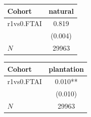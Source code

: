 {
\def\sym#1{\ifmmode^{#1}\else\(^{#1}\)\fi}
\begin{tabular}{l*{1}{c}}
\toprule
Cohort    &  natural   \\
\midrule
r1vs0.FTAI&    0.819   \\
          &  (0.004)   \\
\midrule
\(N\)     &    29963   \\
\bottomrule
\end{tabular}
}
{
\def\sym#1{\ifmmode^{#1}\else\(^{#1}\)\fi}
\begin{tabular}{l*{1}{c}}
\toprule
Cohort    &plantation   \\
\midrule
r1vs0.FTAI&    0.010** \\
          &  (0.010)   \\
\midrule
\(N\)     &    29963   \\
\bottomrule
\end{tabular}
}
